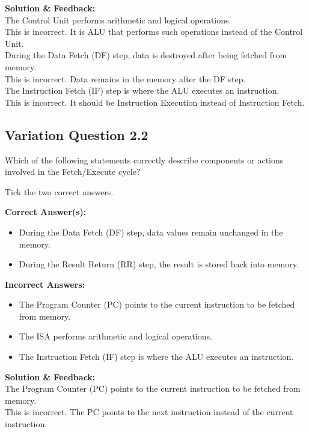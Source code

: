 \textbf{Solution \& Feedback:}\\
The Control Unit performs arithmetic and logical operations.\\
This is incorrect. It is ALU that performs such operations instead of the Control Unit.\\

During the Data Fetch (DF) step, data is destroyed after being fetched from memory.\\
This is incorrect. Data remains in the memory after the DF step.\\

The Instruction Fetch (IF) step is where the ALU executes an instruction.\\
This is incorrect. It should be Instruction Execution instead of Instruction Fetch.

\subsection{Variation Question 2.2}

Which of the following statements correctly describe components or actions involved in the Fetch/Execute cycle?

Tick the two correct answers.

\textbf{Correct Answer(s):}
\begin{itemize}
    \item During the Data Fetch (DF) step, data values remain unchanged in the memory.
    \item During the Result Return (RR) step, the result is stored back into memory.
\end{itemize}

\textbf{Incorrect Answers:}
\begin{itemize}
    \item The Program Counter (PC) points to the current instruction to be fetched from memory.
    \item The ISA performs arithmetic and logical operations.
    \item The Instruction Fetch (IF) step is where the ALU executes an instruction.
\end{itemize}

\textbf{Solution \& Feedback:}\\
The Program Counter (PC) points to the current instruction to be fetched from memory.\\
This is incorrect. The PC points to the next instruction instead of the current instruction.\\

